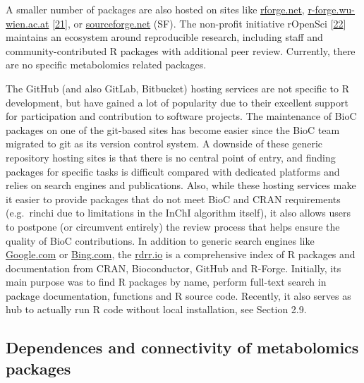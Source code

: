 \documentclass[]{article}
\begin{document}
A smaller number of packages are also hosted on sites like \href{https://rforge.net/}{rforge.net}, \href{http://r-forge.wu-wien.ac.at/}{r-forge.wu-wien.ac.at} {[}\protect\hyperlink{ref-theul_2009}{21}{]}, or \href{https://sourceforge.net/}{sourceforge.net} (SF). The non-profit initiative rOpenSci {[}\protect\hyperlink{ref-boettiger_2015}{22}{]} maintains an ecosystem around reproducible research, including staff and community-contributed R packages with additional peer review. Currently, there are no specific metabolomics related packages.

The GitHub (and also GitLab, Bitbucket) hosting services are not specific to R development, but have gained a lot of popularity due to their excellent support for participation and contribution to software projects. The maintenance of BioC packages on one of the git-based sites has become easier since the BioC team migrated to git as its version control system. A downside of these generic repository hosting sites is that there is no central point of entry, and finding packages for specific tasks is difficult compared with dedicated platforms and relies on search engines and publications. Also, while these hosting services make it easier to provide packages that do not meet BioC and CRAN requirements (e.g.~rinchi due to limitations in the InChI algorithm itself), it also allows users to postpone (or circumvent entirely) the review process that helps ensure the quality of BioC contributions. In addition to generic search engines like \href{http://google.com}{Google}\href{http://google.com}{.com} or \href{http://bing.com}{Bing}\href{http://bing.com}{.com}, the \href{https://rdrr.io/}{rdrr.io} is a comprehensive index of R packages and documentation from CRAN, Bioconductor, GitHub and R-Forge. Initially, its main purpose was to find R packages by name, perform full-text search in package documentation, functions and R source code. Recently, it also serves as hub to actually run R code without local installation, see Section 2.9.

\newpage

\hypertarget{dependences-and-connectivity-of-metabolomics-packages}{%
\subsection{Dependences and connectivity of metabolomics packages}\label{dependences-and-connectivity-of-metabolomics-packages}}
\end{document}
